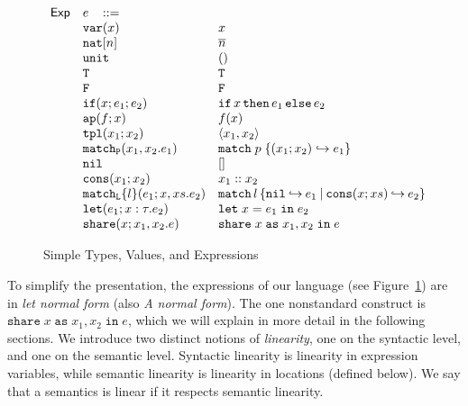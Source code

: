 \documentclass{easychair}
\newcommand{\ms}[1]{\ensuremath{\mathsf{#1}}}
\newcommand{\irl}[1]{\mathtt{#1}}
\newcommand{\paircaseabt}[4]{\irl{match_P}(#2,#3.#4)}
\newcommand{\paircasecst}[4]{\irl{match} \; #1\; \{(#2;#3) \hookrightarrow #4\}}
\newcommand{\sharecst}[4]{\irl{share}\;#1\;\irl{as}\;#2,#3\;\irl{in}\;#4}
\newcommand{\shareabt}[4]{\irl{share}(#1;#2,#3.#4)}
\theoremstyle{definition}
\begin{document}
\begin{figure}[t!]
\begin{minipage}[t]{0.59\linewidth}
\[\begin{array}{r l l l}
\ms{Exp}
        & e   \,\,\,\,\, ::= \\
 	& \irl{var}(x)                                			& x 											\\	
  & \irl{nat}[n]							& \numeral{n}											\\	
  & \irl{unit}							& ()											\\	
  & \irl{T}							& \irl{T}											\\	
  & \irl{F}	   					& \irl{F}											\\	
  & \ifexabt{x}{e_1}{e_2} & \ifexcst{x}{e_1}{e_2} \\ 
  & \irl{ap}(f;x) 					& \appcst{f}{x} 									\\	
  & \irl{tpl}(x_1;x_2)     	& \pairexcst{x_1}{x_2}                								\\	
 	& \paircaseabt{p}{x_1}{x_2}{e_1}					& \paircasecst{p}{x_1}{x_2}{e_1}   \\	
 	& \nilexabt					& []   									\\	
 	& \consexabt{x_1}{x_2}					& x_1::x_2   									\\	
 	& \listcaseexabt{l}{e_1}{x}{xs}{e_2}					& \listcaseexcst{l}{e_1}{x}{xs}{e_2}   \\	
  & \irl{let}(e_1; x : \tau.e_2)			& \irl{let}\; x = e_1 \; \irl{in}\; e_2   \\	
  & \shareabt{x}{x_1}{x_2}{e} &\sharecst{x}{x_1}{x_2}{e}\\ 
\end{array}
\]
\end{minipage}

	\caption{Simple Types, Values, and Expressions }
\label{fig:exp}
\end{figure}

To simplify the presentation, the expressions of our language (see Figure~\ref{fig:exp}) are in \emph{let normal form} (also \emph{A normal form}).
The one nonstandard construct is $\sharecst{x}{x_1}{x_2}{e}$, which we will explain in more 
detail in the following sections. We introduce two distinct notions of \emph{linearity}, one on 
the syntactic level, and one on the semantic level. Syntactic linearity is linearity in 
expression variables, while semantic linearity is linearity in locations (defined below).
We say that a semantics is linear if it respects semantic linearity.
\end{document}
